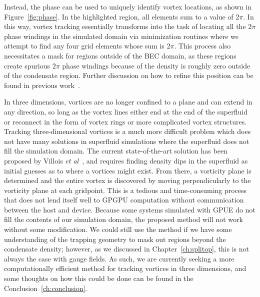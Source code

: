 Instead, the phase can be used to uniquely identify vortex locations, as shown in Figure~\ref{fig:phase}.
In the highlighted region, all elements sum to a value of $2\pi$.
In this way, vortex tracking essentially transforms into the task of locating all the $2\pi$ phase windings in the simulated domain via minimization routines where we attempt to find any four grid elements whose sum is $2\pi$.
This process also necessitates a mask for regions outside of the BEC domain, as these regions create spurious $2\pi$ phase windings because of the density is roughly zero outside of the condensate region. 
Further discussion on how to refine this position can be found in previous work~\cite{o2017, docs}.

In three dimensions, vortices are no longer confined to a plane and can extend in any direction, so long as the vortex lines either end at the end of the superfluid or reconnect in the form of vortex rings or more complicated vortex structures.
Tracking three-dimensional vortices is a much more difficult problem which does not have many solutions in superfluid simulations where the superfluid does not fill the simulation domain.
The current state-of-the-art solution has been proposed by Villois \textit{et al}~\cite{villois2016}, and requires finding density dips in the superfluid as initial guesses as to where a vortices might exist.
From there, a vorticity plane is determined and the entire vortex is discovered by moving perpendicularly to the vorticity plane at each gridpoint.
This is a tedious and time-consuming process that does not lend itself well to GPGPU computation without communication between the host and device.
Because some systems simulated with GPUE do not fill the contents of our simulation domain, the proposed method will not work without some modification.
We could still use the method if we have some understanding of the trapping geometry to mask out regions beyond the condensate density; however, as we discussed in Chapter~\ref{ch:splitop}, this is not always the case with gauge fields.
As such, we are currently seeking a more computationally efficient method for tracking vortices in three dimensions, and some thoughts on how this could be done can be found in the Conclusion~\ref{ch:conclusion}.

